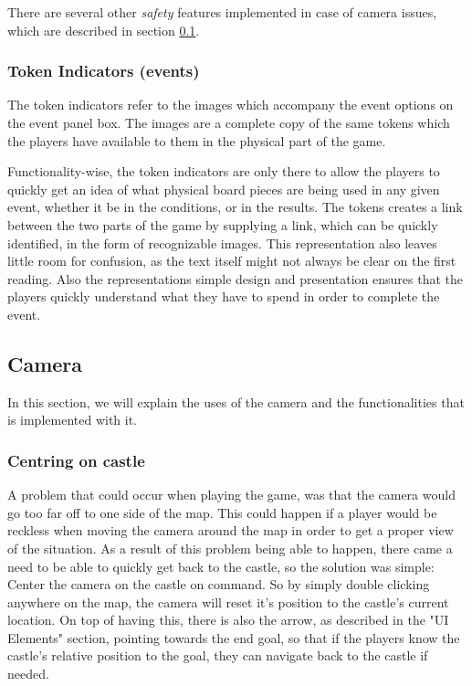 There are several other \textit{safety} features implemented in case of camera issues, which are described in section \ref{sec:cam}.

\subsubsection{Token Indicators (events)}
The token indicators refer to the images which accompany the event options on the event panel box. The images are a complete copy of the same tokens which the players have available to them in the physical part of the game. 

Functionality-wise, the token indicators are only there to allow the players to quickly get an idea of what physical board pieces are being used in any given event, whether it be in the conditions, or in the results. 
The tokens creates a link between the two parts of the game by supplying a link, which can be quickly identified, in the form of recognizable images. 
This representation also leaves little room for confusion, as the text itself might not always be clear on the first reading. 
Also the representations simple design and presentation ensures that the players quickly understand what they have to spend in order to complete the event. 

\subsection{Camera}
\label{sec:cam}
In this section, we will explain the uses of the camera and the functionalities that is implemented with it. 

\subsubsection{Centring on castle}
A problem that could occur when playing the game, was that the camera would go too far off to one side of the map. This could happen if a player would be reckless when moving the camera around the map in order to get a proper view of the situation. As a result of this problem being able to happen, there came a need to be able to quickly get back to the castle, so the solution was simple: Center the camera on the castle on command. So by simply double clicking anywhere on the map, the camera will reset it's position to the castle's current location. On top of having this, there is also the arrow, as described in the "UI Elements" section, pointing towards the end goal, so that if the players know the castle's relative position to the goal, they can navigate back to the castle if needed. 

